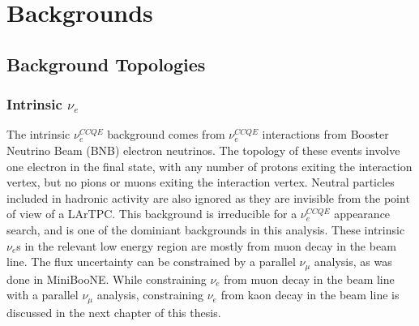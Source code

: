 \section{Backgrounds}

\subsection{Background Topologies}\label{LEEbackgroundtopologiessection}

\subsubsection{Intrinsic $\nu_e$}
The intrinsic $\nu_e^{CCQE}$ background comes from $\nu_e^{CCQE}$ interactions from Booster Neutrino Beam (BNB) electron neutrinos. The topology of these events involve one electron in the final state, with any number of protons exiting the interaction vertex, but no pions or muons exiting the interaction vertex. Neutral particles included in hadronic activity are also ignored as they are invisible from the point of view of a LArTPC. This background is irreducible for a $\nu_e^{CCQE}$ appearance search, and is one of the dominiant backgrounds in this analysis. These intrinsic $\nu_e$s in the relevant low energy region are mostly from muon decay in the beam line. The flux uncertainty can be constrained by a parallel $\nu_\mu$ analysis, as was done in MiniBooNE. While constraining $\nu_e$ from muon decay in the beam line with a parallel $\nu_\mu$ analysis, constraining $\nu_e$ from kaon decay in the beam line is discussed in the next chapter of this thesis.

